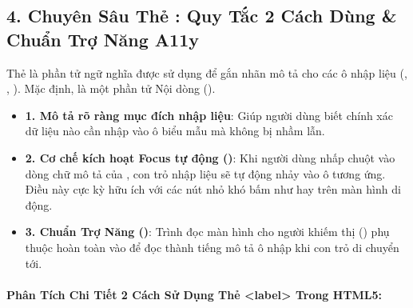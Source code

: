 \subsection{4. Chuyên Sâu Thẻ : Quy Tắc 2 Cách Dùng \& Chuẩn Trợ Năng A11y}

Thẻ  là phần tử ngữ nghĩa được sử dụng để gắn nhãn mô tả cho các ô nhập liệu (, , ). Mặc định,  là một phần tử Nội dòng ().

\begin{conceptBox}
\begin{itemize}[leftmargin=1.5em, itemsep=4pt, parsep=0pt]
    \item \textbf{1. Mô tả rõ ràng mục đích nhập liệu}: Giúp người dùng biết chính xác dữ liệu nào cần nhập vào ô biểu mẫu mà không bị nhầm lẫn.
    \item \textbf{2. Cơ chế kích hoạt Focus tự động ()}: Khi người dùng nhấp chuột vào dòng chữ mô tả của , con trỏ nhập liệu sẽ tự động nhảy vào ô tương ứng. Điều này cực kỳ hữu ích với các nút nhỏ khó bấm như  hay  trên màn hình di động.
    \item \textbf{3. Chuẩn Trợ Năng ()}: Trình đọc màn hình cho người khiếm thị () phụ thuộc hoàn toàn vào  để đọc thành tiếng mô tả ô nhập khi con trỏ di chuyển tới.
\end{itemize}
\end{conceptBox}

\paragraph{Phân Tích Chi Tiết 2 Cách Sử Dụng Thẻ <label> Trong HTML5:}

